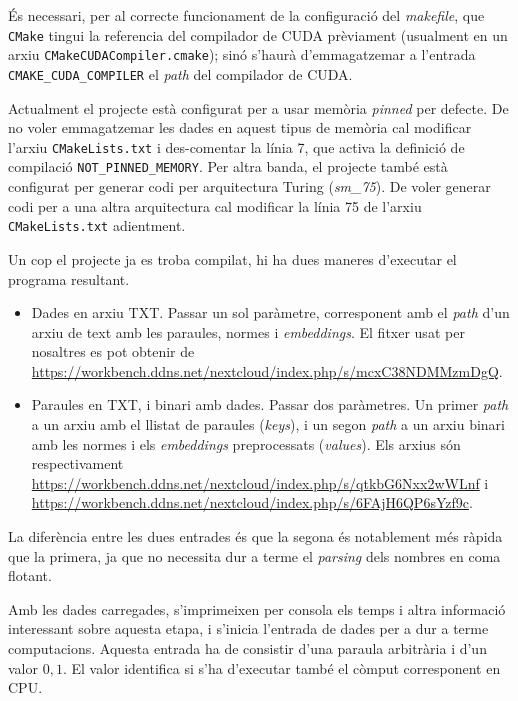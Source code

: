 \documentclass[catalan,10pt,a4paper]{article}
\begin{document}
És necessari, per al correcte funcionament de la configuració del \textit{makefile}, que \verb|CMake| tingui la referencia del compilador de CUDA prèviament (usualment en un arxiu \verb|CMakeCUDACompiler.cmake|); sinó s'haurà d'emmagatzemar a l'entrada \verb|CMAKE_CUDA_COMPILER| el \textit{path} del compilador de CUDA.

Actualment el projecte està configurat per a usar memòria \textit{pinned} per defecte. De no voler emmagatzemar les dades en aquest tipus de memòria cal modificar l'arxiu \verb|CMakeLists.txt| i des-comentar la línia 7, que activa la definició de compilació \verb|NOT_PINNED_MEMORY|. \newline
Per altra banda, el projecte també està configurat per generar codi per arquitectura Turing (\textit{sm\_75}). De voler generar codi per a una altra arquitectura cal modificar la línia 75 de l'arxiu \verb|CMakeLists.txt| adientment.

Un cop el projecte ja es troba compilat, hi ha dues maneres d'executar el programa resultant.
\begin{itemize} %
	\item Dades en arxiu TXT. Passar un sol paràmetre, corresponent amb el \textit{path} d'un arxiu de text amb les paraules, normes i \textit{embeddings}. El fitxer usat per nosaltres es pot obtenir de \url{https://workbench.ddns.net/nextcloud/index.php/s/mcxC38NDMMzmDgQ}.
	\item Paraules en TXT, i binari amb dades. Passar dos paràmetres. Un primer \textit{path} a un arxiu amb el llistat de paraules (\textit{keys}), i un segon \textit{path} a un arxiu binari amb les normes i els \textit{embeddings} preprocessats (\textit{values}). Els arxius són respectivament \url{https://workbench.ddns.net/nextcloud/index.php/s/qtkbG6Nxx2wWLnf} i \url{https://workbench.ddns.net/nextcloud/index.php/s/6FAjH6QP6sYzf9c}.
\end{itemize}
La diferència entre les dues entrades és que la segona és notablement més ràpida que la primera, ja que no necessita dur a terme el \textit{parsing} dels nombres en coma flotant.

Amb les dades carregades, s'imprimeixen per consola els temps i altra informació interessant sobre aquesta etapa, i s'inicia l'entrada de dades per a dur a terme computacions. \newline
Aquesta entrada ha de consistir d'una paraula arbitrària i d'un valor ${0,1}$. El valor identifica si s'ha d'executar també el còmput corresponent en CPU.
\end{document}
